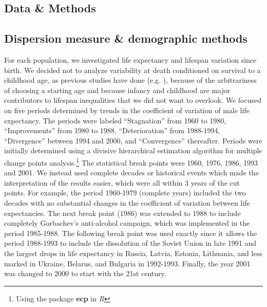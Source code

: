 \documentclass{article}
\begin{document}
\begin{spacing}{1.5}
\section*{Data \& Methods}

\subsection*{Dispersion measure \& demographic methods}

For each population, we investigated life expectancy and lifespan variation since birth. We decided not to analyze variability at death conditioned on survival to a childhood age, as previous studies have done (e.g. \citet{edwards2005, smits2009}), because of the arbitrariness of choosing a starting age and because infancy and childhood are major contributors to lifespan inequalities that we did not want to overlook. We focused on five periods determined by trends in the coefficient of variation of male life expectancy. The periods were labeled ``Stagnation'' from 1960 to 1980, ``Improvements'' from 1980 to 1988, ``Deterioration'' from 1988-1994, ``Divergence'' between 1994 and 2000, and ``Convergence'' thereafter. Periods were initially determined using a divisive hierarchical estimation algorithm for multiple change points analysis.\footnote{Using the package \textbf{ecp} in \textit{R}} The statistical break points were 1960, 1976, 1986, 1993 and 2001. We instead used complete decades or historical events which made the interpretation of the results easier, which were all within 3 years of the cut points. For example, the period 1960-1979 (complete years) included the two decades with no substantial changes in the coefficient of variation between life expectancies. The next break point (1986) was extended to 1988 to include completely Gorbachev's anti-alcohol campaign, which was implemented in the period 1985-1988. The following break point was used exactly since it allows the period 1988-1993 to include the dissolution of the Soviet Union in late 1991 and the largest drops in life expectancy in Russia, Latvia, Estonia, Lithuania, and less marked in Ukraine, Belarus, and Bulgaria in 1992-1993. Finally, the year 2001 was changed to 2000 to start with the 21st century.



\end{spacing}
\end{document}
